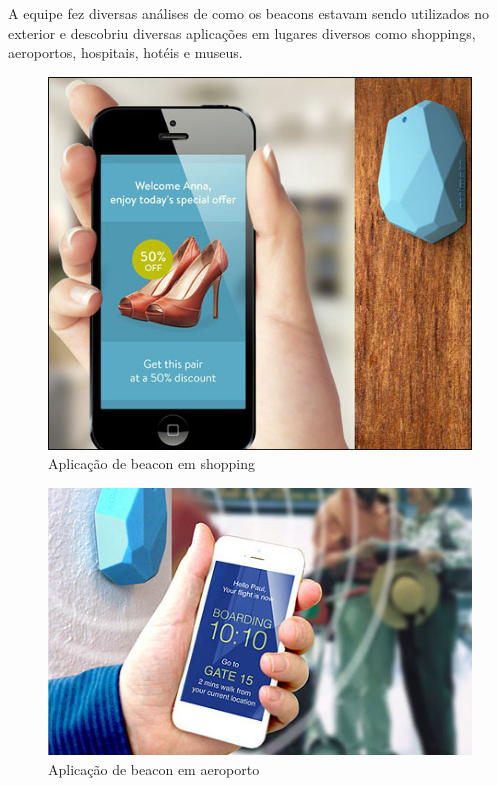 A equipe fez diversas análises de como os beacons estavam sendo utilizados no exterior e descobriu diversas aplicações em lugares diversos como shoppings, aeroportos, hospitais, hotéis e museus.

\begin{figure}[H]
\caption{Aplicação de beacon em shopping}
\centerline{\includegraphics[scale=0.5]{img/beaconShopping}}
\label{fig:beaconShopping}
\end{figure}

\begin{figure}[H]
\caption{Aplicação de beacon em aeroporto}
\centerline{\includegraphics[scale=0.5]{img/beaconAeroporto}}
\label{fig:beaconAeroporto}
\end{figure}

